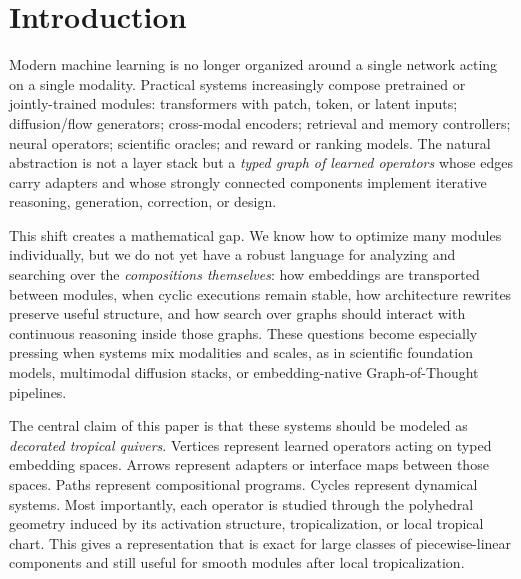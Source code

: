 \documentclass[11pt]{article}
\theoremstyle{definition}
\theoremstyle{plain}
\theoremstyle{remark}
\begin{document}
\begin{abstract}
The manuscript emphasizes formal definitions, rigorous propositions, implementation-oriented algorithms, and realistic examples.
These include continuous GoT reasoning GFlowNets, multimodal source/sink compositions linking NatureLM-style cross-domain sequence reasoning to MDGen-style SiT generative dynamics, and multi-model therapeutic design cycles that couple generators, evaluators, structure predictors, cell-state models, and phenotype or variant predictors through adapter-mediated embedding spaces.
The result is a tropical, quiver-theoretic, ergodic framework for architecture design and search that is intended to be both mathematically serious and practically actionable.
\end{abstract}

\tableofcontents
 

\section{Introduction}
\label{sec:intro}

Modern machine learning is no longer organized around a single network acting on a single modality.
Practical systems increasingly compose pretrained or jointly-trained modules:
transformers with patch, token, or latent inputs; diffusion/flow generators; cross-modal encoders; retrieval and memory controllers; neural operators; scientific oracles; and reward or ranking models.
The natural abstraction is not a layer stack but a \emph{typed graph of learned operators} whose edges carry adapters and whose strongly connected components implement iterative reasoning, generation, correction, or design.

This shift creates a mathematical gap.
We know how to optimize many modules individually, but we do not yet have a robust language for analyzing and searching over the \emph{compositions themselves}:
how embeddings are transported between modules, when cyclic executions remain stable, how architecture rewrites preserve useful structure, and how search over graphs should interact with continuous reasoning inside those graphs.
These questions become especially pressing when systems mix modalities and scales, as in scientific foundation models, multimodal diffusion stacks, or embedding-native Graph-of-Thought pipelines.

The central claim of this paper is that these systems should be modeled as \emph{decorated tropical quivers}.
Vertices represent learned operators acting on typed embedding spaces.
Arrows represent adapters or interface maps between those spaces.
Paths represent compositional programs.
Cycles represent dynamical systems.
Most importantly, each operator is studied through the polyhedral geometry induced by its activation structure, tropicalization, or local tropical chart.
This gives a representation that is exact for large classes of piecewise-linear components and still useful for smooth modules after local tropicalization.
\end{document}
